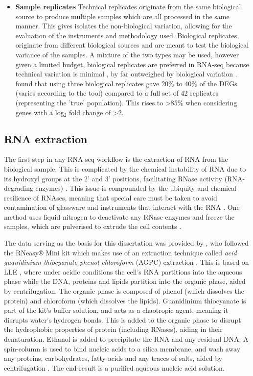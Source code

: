 \begin{itemize}
\item[] \textbf{Sample replicates} \hspace{0.15cm} Technical replicates originate from the same biological source to produce multiple samples which are all processed in the same manner. This gives isolates the non-biological variation, allowing for the evaluation of the instruments and methodology used. Biological replicates originate from different biological sources and are meant to test the biological variance of the samples. A mixture of the two types may be used, however given a limited budget, biological replicates are preferred in RNA-seq because technical variation is minimal \citep{bullard2010evaluation}, by far outweighed by biological variation \citep{liu2014rna}. \cite{schurch2016many} found that using three biological replicates gave 20\% to 40\% of the \ac{DEG}s (varies according to the tool) compared to a full set of 42 replicates (representing the 'true' population). This rises to >85\% when considering genes with a log$_2$ fold change of >2.
\end{itemize}


\subsection{RNA extraction}
The first step in any RNA-seq workflow is the extraction of RNA from the biological sample. This is complicated by the chemical instability of RNA due to its hydroxyl groups at the 2' and 3' positions, facilitating RNase activity (RNA-degrading enzymes) \citep{green2019win}. This issue is compounded by the ubiquity and chemical resilience of RNAses, meaning that special care must be taken to avoid contamination of glassware and instruments that interact with the RNA \citep{green2019win}. One method uses liquid nitrogen to deactivate any RNase enzymes and freeze the samples, which are pulverised to extrude the cell contents \citep{wang1994extraction}. 

The data serving as the basis for this dissertation was provided by \cite{Gatt2016}, who followed the RNeasy® Mini kit \citep{RNeasy} which makes use of an extraction technique called \textit{acid guanidinium thiocyanate-phenol-chloroform} (AGPC) extraction \citep{chomczynski1987single}. This is based on \ac{LLE} \citep{mazzola2008liquid}, where under acidic conditions the cell's RNA partitions into the aqueous phase while the DNA, proteins and lipids partition into the organic phase, aided by centrifugation. The organic phase is composed of phenol (which dissolves the protein) and chloroform (which dissolves the lipids). Guanidinium thiocyanate is part of the kit's buffer solution, and acts as a chaotropic agent, meaning it disrupts water's hydrogen bonds. This is added to the organic phase to disrupt the hydrophobic properties of protein (including RNases), aiding in their denaturation. Ethanol is added to precipitate the RNA and any residual DNA. A spin-column is used to bind nucleic acids to a silica membrane, and wash away any proteins, carbohydrates, fatty acids and any traces of salts, aided by centrifugation \citep{matson2009microarray}. The end-result is a purified aqueous nucleic acid solution. 

